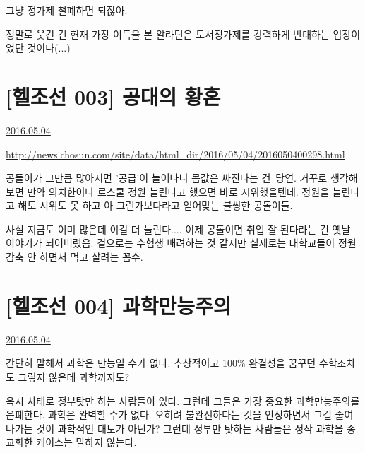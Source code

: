 그냥 정가제 철폐하면 되잖아.
\vspace{5mm}

정말로 웃긴 건 현재 가장 이득을 본 알라딘은 도서정가제를 강력하게 반대하는 입장이었단 것이다(...)
\vspace{5mm}






\section{[헬조선 003] 공대의 황혼}
\href{https://www.kockoc.com/Apoc/759903}{2016.05.04}

\vspace{5mm}

\url{http://news.chosun.com/site/data/html_dir/2016/05/04/2016050400298.html}
\vspace{5mm}

공돌이가 그만큼 많아지면 '공급'이 늘어나니 몸값은 싸진다는 건 당연.
거꾸로 생각해보면 만약 의치한이나 로스쿨 정원 늘린다고 했으면 바로 시위했을텐데.
정원을 늘린다고 해도 시위도 못 하고 아 그런가보다라고 얻어맞는 불쌍한 공돌이들.
\vspace{5mm}

사실 지금도 이미 많은데 이걸 더 늘린다.... 이제 공돌이면 취업 잘 된다라는 건 옛날 이야기가 되어버렸음.
겉으로는 수험생 배려하는 것 같지만 실제로는 대학교들이 정원감축 안 하면서 먹고 살려는 꼼수.
\vspace{5mm}






\section{[헬조선 004] 과학만능주의}
\href{https://www.kockoc.com/Apoc/760048}{2016.05.04}

\vspace{5mm}

간단히 말해서 과학은 만능일 수가 없다.
추상적이고 100$\%$ 완결성을 꿈꾸던 수학조차도 그렇지 않은데 과학까지도?
\vspace{5mm}

옥시 사태로 정부탓만 하는 사람들이 있다. 그런데 그들은 가장 중요한 과학만능주의를 은폐한다.
과학은 완벽할 수가 없다. 오히려 불완전하다는 것을 인정하면서 그걸 줄여나가는 것이 과학적인 태도가 아닌가?
그런데 정부만 탓하는 사람들은 정작 과학을 종교화한 케이스는 말하지 않는다.
\vspace{5mm}

